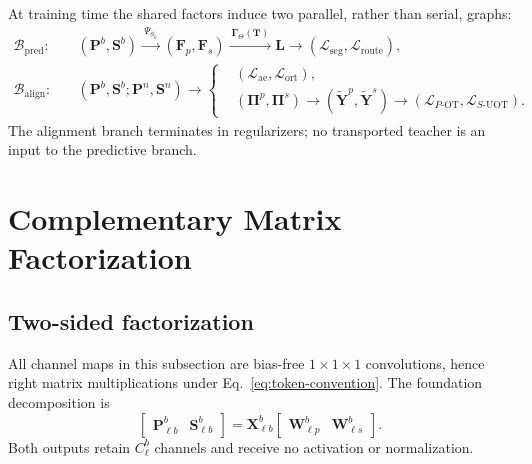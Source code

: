 \documentclass[10pt]{article}
\newcommand{\cL}{\mathcal{L}}
\begin{document}
At training time the shared factors induce two parallel, rather than serial,
graphs:
\begin{equation}
\boxed{
\begin{aligned}
 \mathcal B_{\mathrm{pred}}:\quad
 &(\bm P^b,\bm S^b)
 \xrightarrow{\ \Psi_{\phi_b}\ }
 (\bm F_p,\bm F_s)
 \xrightarrow{\ \bm\Gamma_\Theta(\bm T)\ }
 \bm L
 \longrightarrow(\cL_{\mathrm{seg}},\cL_{\mathrm{route}}),\\
 \mathcal B_{\mathrm{align}}:\quad
 &(\bm P^b,\bm S^b;\bm P^n,\bm S^n)
 \longrightarrow
 \left\{
 \begin{aligned}
  &(\cL_{\mathrm{ae}},\cL_{\mathrm{ort}}),\\[-1mm]
  &(\bm\Pi^p,\bm\Pi^s)
   \longrightarrow(\widetilde{\bm Y}^p,\widetilde{\bm Y}^s)
   \longrightarrow(\cL_{P\text{-OT}},\cL_{S\text{-UOT}}).
 \end{aligned}
 \right.
\end{aligned}}
\label{eq:parallel-training-graph}
\end{equation}
The alignment branch terminates in regularizers; no transported teacher is an
input to the predictive branch.

\section{Complementary Matrix Factorization}

\subsection{Two-sided factorization}

All channel maps in this subsection are bias-free $1\times1\times1$
convolutions, hence right matrix multiplications under
Eq.~\eqref{eq:token-convention}.  The foundation decomposition is
\begin{equation}
\boxed{
 \begin{bmatrix}\bm P_{\ell b}^b&\bm S_{\ell b}^b\end{bmatrix}
 =
 \bm X_{\ell b}^b
 \begin{bmatrix}\bm W_{\ell p}^b&\bm W_{\ell s}^b\end{bmatrix}.}
\label{eq:foundation-factor}
\end{equation}
Both outputs retain $C_\ell^b$ channels and receive no activation or
normalization.
\end{document}
